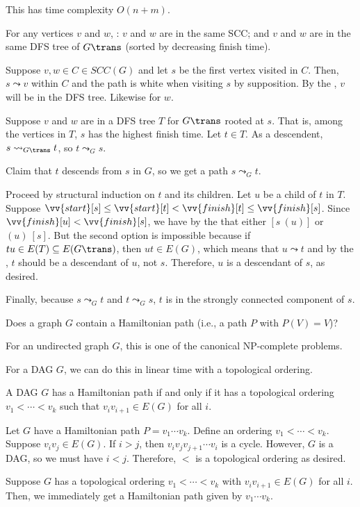 This has time complexity $O(n+m)$.

\begin{prop}
  For any vertices $v$ and $w$, \Tfae:
  $v$ and $w$ are in the same SCC; and
  $v$ and $w$ are in the same DFS tree of $G\trans$ (sorted by decreasing finish time).
\end{prop}
\begin{prf}
  Suppose $v, w \in C \in SCC(G)$ and let $s$ be the first vertex visited in $C$.
  Then, $s \leadsto v$ within $C$ and the path is white when visiting $s$ by supposition.
  By the , $v$ will be in the DFS tree.
  Likewise for $w$.

  Suppose $v$ and $w$ are in a DFS tree $T$ for $G\trans$ rooted at $s$.
  That is, among the vertices in $T$, $s$ has the highest finish time.
  Let $t \in T$.
  As a descendent, $s \leadsto_{G\trans} t$, so $t \leadsto_G s$.

  Claim that $t$ descends from $s$ in $G$, so we get a path $s \leadsto_G t$.

  Proceed by structural induction on $t$ and its children.
  Let $u$ be a child of $t$ in $T$.
  Suppose $\vv{start}[s] \leq \vv{start}[t] < \vv{finish}[t] \leq \vv{finish}[s]$.
  Since $\vv{finish}[u] < \vv{finish}[s]$, we have by the 
  that either $[s\ (u)]$ or $(u)\ [s]$.
  But the second option is impossible because if $tu \in E(T) \subseteq E(G\trans)$,
  then $ut \in E(G)$, which means that $u \leadsto t$ and by the ,
  $t$ should be a descendant of $u$, not $s$.
  Therefore, $u$ is a descendant of $s$, as desired.

  Finally, because $s \leadsto_G t$ and $t \leadsto_G s$,
  $t$ is in the strongly connected component of $s$.
\end{prf}

\begin{problem}
  Does a graph $G$ contain a Hamiltonian path (i.e., a path $P$ with $P(V) = V$)?
\end{problem}

For an undirected graph $G$, this is one of the canonical NP-complete problems.

For a DAG $G$, we can do this in linear time with a topological ordering.

\begin{prop}
  A DAG $G$ has a Hamiltonian path if and only if it has a topological ordering
  $v_1 < \dotsb < v_k$ such that $v_iv_{i+1} \in E(G)$ for all $i$.
\end{prop}
\begin{prf}
  Let $G$ have a Hamiltonian path $P = v_1\dotsb v_k$.
  Define an ordering $v_1 < \dotsb < v_k$.
  Suppose $v_i v_j \in E(G)$.
  If $i > j$, then $v_i v_j v_{j+1} \dotsb v_i$ is a cycle.
  However, $G$ is a DAG, so we must have $i < j$.
  Therefore, $<$ is a topological ordering as desired.

  Suppose $G$ has a topological ordering $v_1 < \dotsb < v_k$
  with $v_iv_{i+1} \in E(G)$ for all $i$.
  Then, we immediately get a Hamiltonian path given by $v_1 \dotsb v_k$.
\end{prf}
